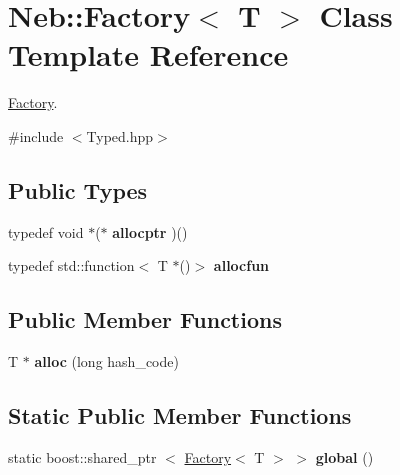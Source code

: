 \hypertarget{classNeb_1_1Factory}{\section{\-Neb\-:\-:\-Factory$<$ \-T $>$ \-Class \-Template \-Reference}
\label{classNeb_1_1Factory}
}


\hyperlink{classNeb_1_1Factory}{\-Factory}.  




{\ttfamily \#include $<$\-Typed.\-hpp$>$}

\subsection*{\-Public \-Types}
\begin{DoxyCompactItemize}
\item 
\hypertarget{classNeb_1_1Factory_a27acfb756f654d0cc21c7e8a6b087cb0}{typedef void $\ast$($\ast$ {\bfseries allocptr} )()}\label{classNeb_1_1Factory_a27acfb756f654d0cc21c7e8a6b087cb0}

\item 
\hypertarget{classNeb_1_1Factory_a1563001d6157ee7a3dec5adbb5f7a066}{typedef std\-::function$<$ \-T $\ast$()$>$ {\bfseries allocfun}}\label{classNeb_1_1Factory_a1563001d6157ee7a3dec5adbb5f7a066}

\end{DoxyCompactItemize}
\subsection*{\-Public \-Member \-Functions}
\begin{DoxyCompactItemize}
\item 
\hypertarget{classNeb_1_1Factory_acf737fbedc2c0ce6583dd7144947d51b}{\-T $\ast$ {\bfseries alloc} (long hash\-\_\-code)}\label{classNeb_1_1Factory_acf737fbedc2c0ce6583dd7144947d51b}

\end{DoxyCompactItemize}
\subsection*{\-Static \-Public \-Member \-Functions}
\begin{DoxyCompactItemize}
\item 
\hypertarget{classNeb_1_1Factory_a8d30d92c97c32b968d95e5b503ab5f7d}{static boost\-::shared\-\_\-ptr\*
$<$ \hyperlink{classNeb_1_1Factory}{\-Factory}$<$ \-T $>$ $>$ {\bfseries global} ()}\label{classNeb_1_1Factory_a8d30d92c97c32b968d95e5b503ab5f7d}

\end{DoxyCompactItemize}


